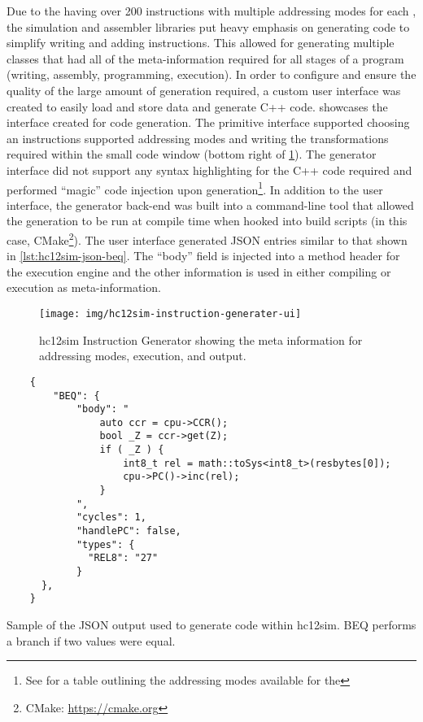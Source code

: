 Due to the \hcmodel{} having over 200 instructions with multiple addressing modes for each \cite{hc12Manual2006}, the simulation and assembler libraries put heavy emphasis on generating code to simplify writing and adding instructions. This allowed for generating multiple classes that had all of the meta-information required for all stages of a program (writing, assembly, programming, execution). In order to configure and ensure the quality of the large amount of generation required, a custom user interface was created to easily load and store data and generate C++ code.  showcases the interface created for code generation. The primitive interface supported choosing an instructions supported addressing modes and writing the transformations required within the small code window (bottom right of \cref{fig:hc12sim-instruction-generater-ui}). The generator interface did not support any syntax highlighting for the C++ code required and performed ``magic'' code injection upon generation\footnote{See \cite[Table~3-1,~p.~30]{hc12Manual2006} for a table outlining the addressing modes available for the \hcmodel{}}. In addition to the user interface, the generator back-end was built into a command-line tool that allowed the generation to be run at compile time when hooked into build scripts (in this case, CMake\footnote{CMake: \url{https://cmake.org}}). The user interface generated JSON entries similar to that shown in \cref{lst:hc12sim-json-beq}. The ``body'' field is injected into a method header for the execution engine and the other information is used in either compiling or execution as meta-information.

\begin{figure}[h!t]
    \centering
    \texttt{[image: img/hc12sim-instruction-generater-ui]}
    \caption{hc12sim Instruction Generator showing the meta information for addressing modes, execution, and output.}
    \label{fig:hc12sim-instruction-generater-ui}
\end{figure}

\begin{listing}[htp]
    \begin{verbatim}
    {
        "BEQ": {
            "body": "
                auto ccr = cpu->CCR();
                bool _Z = ccr->get(Z);
                if ( _Z ) {
                    int8_t rel = math::toSys<int8_t>(resbytes[0]);
                    cpu->PC()->inc(rel);
                }
            ",
            "cycles": 1,
            "handlePC": false,
            "types": {
              "REL8": "27"
            }
      },
    }
    \end{verbatim}
    \caption{Sample of the JSON output used to generate code within hc12sim. BEQ performs a branch if two values were equal.}
    \label{lst:hc12sim-json-beq}
\end{listing}

